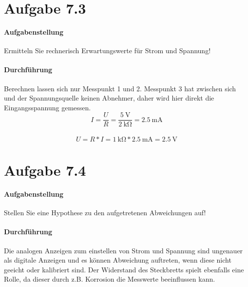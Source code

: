 \section{Aufgabe 7.3}
\paragraph{Aufgabenstellung}
Ermitteln Sie rechnerisch Erwartungswerte für Strom und Spannung!

\paragraph{Durchführung}
Berechnen lassen sich nur Messpunkt 1 und 2. Messpunkt 3 hat zwischen sich und der Spannungsquelle keinen Abnehmer, daher wird hier direkt die Eingangsspannung gemessen. \\
\[I=\frac{U}{R}=\frac{\SI{5}{\volt}}{\SI{2}{\kilo\ohm}}=\SI{2,5}{\milli\ampere}\] \\
\[U=R*I=\SI{1}{\kilo\ohm}*\SI{2,5}{\milli\ampere}=\SI{2,5}{\volt}\]

\section{Aufgabe 7.4}
\paragraph{Aufgabenstellung}
Stellen Sie eine Hypothese zu den aufgetretenen Abweichungen auf!

\paragraph{Durchführung}
Die analogen Anzeigen zum einstellen von Strom und Spannung sind ungenauer als digitale Anzeigen und es können Abweichung auftreten, wenn diese nicht geeicht oder kalibriert sind. Der Widerstand des Steckbretts spielt ebenfalls eine Rolle, da dieser durch z.B. Korrosion die Messwerte beeinflussen kann.